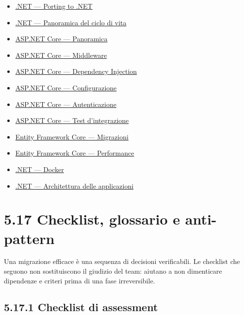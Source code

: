 \documentclass[
  italian,
  10pt,
]{book}
\providecommand{\tightlist}{%
  \setlength{\itemsep}{0pt}\setlength{\parskip}{0pt}}
\begin{document}
\begin{itemize}
\tightlist
\item
  \href{https://learn.microsoft.com/dotnet/core/porting/}{.NET ---
  Porting to .NET}
\item
  \href{https://dotnet.microsoft.com/platform/support/policy/dotnet-core}{.NET
  --- Panoramica del ciclo di vita}
\item
  \href{https://learn.microsoft.com/aspnet/core/introduction-to-aspnet-core}{ASP.NET
  Core --- Panoramica}
\item
  \href{https://learn.microsoft.com/aspnet/core/fundamentals/middleware/}{ASP.NET
  Core --- Middleware}
\item
  \href{https://learn.microsoft.com/dotnet/core/extensions/dependency-injection}{ASP.NET
  Core --- Dependency Injection}
\item
  \href{https://learn.microsoft.com/aspnet/core/fundamentals/configuration/}{ASP.NET
  Core --- Configurazione}
\item
  \href{https://learn.microsoft.com/aspnet/core/security/authentication/}{ASP.NET
  Core --- Autenticazione}
\item
  \href{https://learn.microsoft.com/aspnet/core/test/integration-tests}{ASP.NET
  Core --- Test d'integrazione}
\item
  \href{https://learn.microsoft.com/ef/core/managing-schemas/migrations/}{Entity
  Framework Core --- Migrazioni}
\item
  \href{https://learn.microsoft.com/ef/core/performance/}{Entity
  Framework Core --- Performance}
\item
  \href{https://learn.microsoft.com/dotnet/core/docker/}{.NET ---
  Docker}
\item
  \href{https://learn.microsoft.com/dotnet/architecture/}{.NET ---
  Architettura delle applicazioni}
\end{itemize}

\section{5.17 Checklist, glossario e
anti-pattern}\label{checklist-glossario-e-anti-pattern}

Una migrazione efficace è una sequenza di decisioni verificabili. Le
checklist che seguono non sostituiscono il giudizio del team: aiutano a
non dimenticare dipendenze e criteri prima di una fase irreversibile.

\subsection{5.17.1 Checklist di
assessment}\label{checklist-di-assessment}
\end{document}
